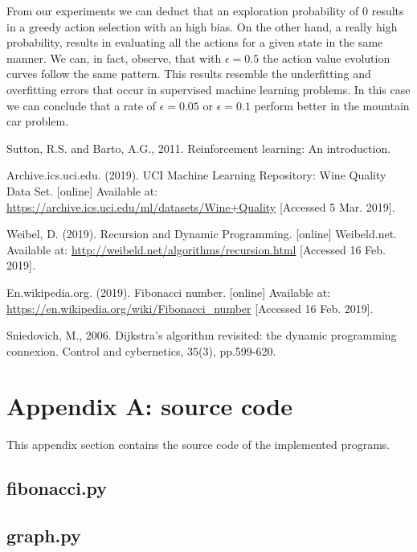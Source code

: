 \documentclass[runningheads]{llncs}
\begin{document}
From our experiments we can deduct that an exploration probability of
$0$ results in a greedy action selection with an high bias. On the
other hand, a really high probability, results in evaluating all the
actions for a given state in the same manner. We can, in fact,
observe, that with $\epsilon = 0.5$ the action value evolution curves
follow the same pattern. This results resemble the underfitting and
overfitting errors that occur in supervised machine learning
problems. In this case we can conclude that a rate of $\epsilon =
0.05$ or $\epsilon = 0.1$ perform better in the mountain car problem.

\begin{thebibliography}{8}

Sutton, R.S. and Barto, A.G., 2011. Reinforcement learning: An introduction.

Archive.ics.uci.edu. (2019). UCI Machine Learning Repository: Wine Quality Data Set. [online] Available at: \url{https://archive.ics.uci.edu/ml/datasets/Wine+Quality} [Accessed 5 Mar. 2019].

Weibel, D. (2019). Recursion and Dynamic Programming. [online] Weibeld.net. Available at: \url{http://weibeld.net/algorithms/recursion.html} [Accessed 16 Feb. 2019].

En.wikipedia.org. (2019). Fibonacci number. [online] Available at: \url{https://en.wikipedia.org/wiki/Fibonacci\_number} [Accessed 16 Feb. 2019].

Sniedovich, M., 2006. Dijkstra's algorithm revisited: the dynamic programming connexion. Control and cybernetics, 35(3), pp.599-620.

\end{thebibliography}


\section{Appendix A: source code}\label{appendix}
This appendix section contains the source code of the implemented programs.

\subsection{fibonacci.py}\label{fibonacci_code}

\subsection{graph.py}\label{graph_code}
\end{document}
